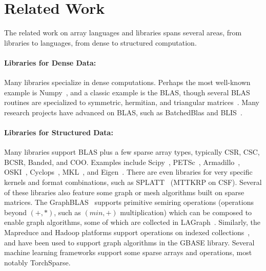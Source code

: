 \section{Related Work}

The related work on array languages and libraries spans several areas, from libraries to languages, from dense to structured computation.

\paragraph{Libraries for Dense Data:}
Many libraries specialize in dense computations.
%
Perhaps the most well-known example is Numpy~\cite{harris_array_2020},
and a classic example is the BLAS, though several BLAS routines are specialized to symmetric, hermitian, and triangular matrices~\cite{Anderson1999}. 
%
Many research projects have advanced on BLAS, such as BatchedBlas and BLIS~\cite{dongarra2017design, van2015blis}.

\paragraph{Libraries for Structured Data:}

Many libraries support BLAS plus a few sparse array types, typically CSR, CSC, BCSR, Banded, and COO.
%
Examples include Scipy~\cite{virtanen2020scipy}, PETSc~\cite{abhyankarpetsc}, Armadillo~\cite{Rumengan2021}, OSKI~\cite{vuduc2005oski}, Cyclops~\cite{solomonik2013cyclops}, MKL~\cite{noauthor_developer_2024}, and Eigen~\cite{eigenweb}.
%
There are even libraries for very specific kernels and format combinations, such as SPLATT~\cite{smith2015splatt} (MTTKRP on CSF).
%
Several of these libraries also feature some graph or mesh algorithms built on sparse matrices.
%
The GraphBLAS~\cite{kepner2016mathematical} supports primitive semiring operations (operations beyond $(+, *)$, such as $(min, +)$ multiplication) which can be composed to enable graph algorithms, some of which are collected in LAGraph~\cite{mattson2019lagraph}.
%
Similarly, the Mapreduce and Hadoop platforms support operations on indexed collections~\cite{dean_mapreduce_2008}, and have been used to support graph
algorithms in the GBASE library\cite{kang2011gbase}.
%
Several machine learning frameworks support some sparse arrays and operations, most notably TorchSparse\cite{tang2022torchsparse, tang2023torchsparse++}.
%
